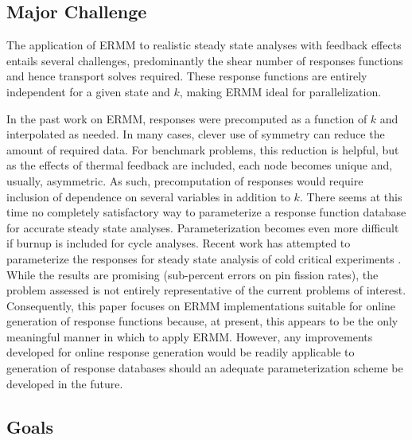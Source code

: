 \subsection{Major Challenge}

The application of ERMM to realistic steady state analyses with 
feedback effects entails several challenges, predominantly 
the shear number of responses functions and hence transport solves
required.  These response functions are entirely independent
for a given state and $k$, making ERMM ideal for parallelization.

In the past work on ERMM, responses were precomputed as a function of 
$k$ and interpolated as needed.  In many cases, clever use of symmetry 
can reduce the amount of required data.  For benchmark problems, this
reduction is helpful, but as the effects of thermal feedback are included, 
each node becomes unique and, usually, asymmetric.  As such, precomputation 
of responses would require inclusion of dependence on several variables
in addition to $k$.
There seems at this time no completely satisfactory way to parameterize 
a response function database for accurate steady state analyses.  
Parameterization becomes even more difficult if burnup is included 
for cycle analyses. Recent work has attempted to parameterize the 
responses for steady state analysis of cold critical 
experiments \cite{hino2012bwr}.  While the results
are promising (sub-percent errors on pin fission rates), the problem 
assessed is not entirely representative of the current problems of interest.
Consequently, this paper focuses on ERMM implementations suitable for 
online generation of response functions because, at present, this appears 
to be the only meaningful manner in which to apply ERMM.  However, any
improvements developed for online response generation would be readily 
applicable to generation of response databases should an adequate 
parameterization scheme be developed in the future.

\subsection{Goals}

